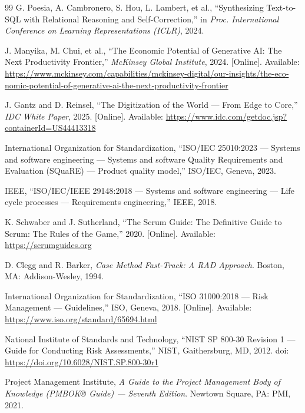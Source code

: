 \begin{thebibliography}{99}
\textenglish{G. Poesia, A. Cambronero, S. Hou, L. Lambert, et al., ``Synthesizing Text-to-SQL with Relational Reasoning and Self-Correction,'' in \textit{Proc. International Conference on Learning Representations (ICLR)}, 2024.}

\textenglish{J. Manyika, M. Chui, et al., ``The Economic Potential of Generative AI: The Next Productivity Frontier,'' \textit{McKinsey Global Institute}, 2024. [Online]. Available: \url{https://www.mckinsey.com/capabilities/mckinsey-digital/our-insights/the-economic-potential-of-generative-ai-the-next-productivity-frontier}}

\textenglish{J. Gantz and D. Reinsel, ``The Digitization of the World — From Edge to Core,'' \textit{IDC White Paper}, 2025. [Online]. Available: \url{https://www.idc.com/getdoc.jsp?containerId=US44413318}}

\textenglish{International Organization for Standardization, ``ISO/IEC 25010:2023 — Systems and software engineering — Systems and software Quality Requirements and Evaluation (SQuaRE) — Product quality model,'' ISO/IEC, Geneva, 2023.}

\textenglish{IEEE, ``ISO/IEC/IEEE 29148:2018 — Systems and software engineering — Life cycle processes — Requirements engineering,'' IEEE, 2018.}

\textenglish{K. Schwaber and J. Sutherland, ``The Scrum Guide: The Definitive Guide to Scrum: The Rules of the Game,'' 2020. [Online]. Available: \url{https://scrumguides.org}}

\textenglish{D. Clegg and R. Barker, \textit{Case Method Fast-Track: A RAD Approach}. Boston, MA: Addison-Wesley, 1994.}


\textenglish{International Organization for Standardization, ``ISO 31000:2018 — Risk Management — Guidelines,'' ISO, Geneva, 2018. [Online]. Available: \url{https://www.iso.org/standard/65694.html}}

\textenglish{National Institute of Standards and Technology, ``NIST SP 800-30 Revision 1 — Guide for Conducting Risk Assessments,'' NIST, Gaithersburg, MD, 2012. doi: \url{https://doi.org/10.6028/NIST.SP.800-30r1}}

\textenglish{Project Management Institute, \textit{A Guide to the Project Management Body of Knowledge (PMBOK® Guide) — Seventh Edition}. Newtown Square, PA: PMI, 2021.}


\end{thebibliography}
